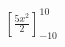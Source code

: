 \documentclass[preview]{standalone}
\begin{document}
\begin{align*}
\left[\frac{5 x^{2}}{2}\right]_{-10}^{10}
\end{align*}
\end{document}
